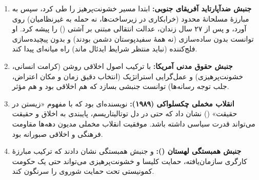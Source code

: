 \begin{tcolorbox}[successbox, title={\textbf{نمونه‌های اخلاق یاری‌رسان}}]
\begin{enumerate}
\item \textbf{جنبش ضدآپارتاید آفریقای جنوبی:}  
ابتدا مسیر خشونت‌پرهیز را طی کرد، سپس به مبارزهٔ مسلحانهٔ محدود 
(خرابکاری در زیرساخت‌ها، نه حمله به غیرنظامیان) روی آورد، و پس از ۲۷ 
سال زندان، عدالت انتقالی مبتنی بر آشتی () را پیشه کرد. او توانست بدون ساده‌سازی (نه همهٔ سفیدپوستان 
دشمن بودند) و بدون پیچیده‌سازی فلج‌کننده (نباید منتظر شرایط ایدئال ماند) 
راه میانه‌ای پیدا کند.

\item \textbf{جنبش حقوق مدنی آمریکا:}  با ترکیب 
اصول اخلاقی روشن (کرامت انسانی، خشونت‌پرهیزی) و عمل‌گرایی استراتژیک 
(انتخاب دقیق زمان و مکان اعتراض، جلب توجه رسانه‌ها) توانست جنبشی بسازد 
که هم اخلاقی بود و هم مؤثر.

\item \textbf{انقلاب مخملی چکسلواکی (۱۹۸۹):}  
نویسنده‌ای بود که با مفهوم «زیستن در حقیقت» () 
نشان داد که حتی در دل توتالیتاریسم، پایبندی به اخلاق و حقیقت می‌تواند 
قدرت سیاسی داشته باشد. موفقیت انقلاب مخملی مدیون دهه‌ها مقاومت فرهنگی 
و اخلاقی صبورانه بود.

\item \textbf{جنبش همبستگی لهستان ():} 
 و جنبش همبستگی نشان دادند که ترکیب مبارزهٔ کارگری 
سازمان‌یافته، حمایت کلیسا و خشونت‌پرهیزی می‌تواند حتی یک حکومت 
کمونیستی تحت حمایت شوروی را سرنگون کند.
\end{enumerate}
\end{tcolorbox}

